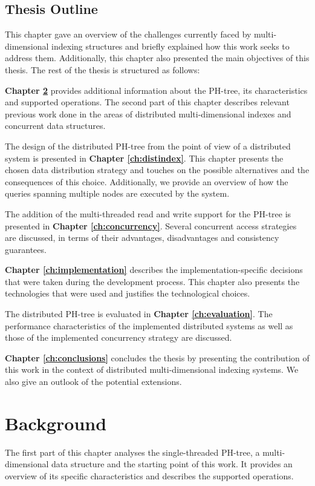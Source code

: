 \documentclass[11pt,a4paper]{globis-book}
\begin{document}
\section{Thesis Outline}
\label{sec:intro-outline}

This chapter gave an overview of the challenges currently faced by multi-dimensional indexing structures and briefly explained how this work seeks to address them. Additionally, this chapter also presented the main objectives of this thesis. The rest of the thesis is structured as follows:

\textbf{Chapter \ref{ch:background}} provides additional information about the PH-tree, its characteristics and supported operations. The second part of this chapter describes relevant previous work done in the areas of distributed multi-dimensional indexes and concurrent data structures.

The design of the distributed PH-tree from the point of view of a distributed system is presented in \textbf{Chapter \ref{ch:distindex}}. This chapter presents the chosen data distribution strategy and touches on the possible alternatives and the consequences of this choice. Additionally, we provide an overview of how the queries spanning multiple nodes are executed by the system.

The addition of the multi-threaded read and write support for the PH-tree is presented in \textbf{Chapter \ref{ch:concurrency}}. Several concurrent access strategies are discussed, in terms of their advantages, disadvantages and consistency guarantees.

\textbf{Chapter \ref{ch:implementation}} describes the implementation-specific decisions that were taken during the development process. This chapter also presents the technologies that were used and justifies the technological choices.

The distributed PH-tree is evaluated in \textbf{Chapter \ref{ch:evaluation}}. The performance characteristics of the implemented distributed systems as well as those of the implemented concurrency strategy are discussed.

\textbf{Chapter \ref{ch:conclusions}} concludes the thesis by presenting the contribution of this work in the context of distributed multi-dimensional indexing systems. We also give an outlook of the potential extensions. 

\chapter{Background}
\label{ch:background}
The first part of this chapter analyses the single-threaded PH-tree, a multi-dimensional data structure and the starting point of this work. It provides an overview of its specific characteristics and describes the supported operations.
\end{document}
